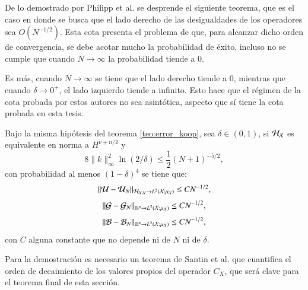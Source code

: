 De lo demostrado por Philipp et al. se desprende el siguiente teorema, que es el caso en donde se busca que el lado derecho de las desigualdades de los operadores sea $O(N^{-1/2})$. Esta cota presenta el problema de que, para alcanzar dicho orden de convergencia, se debe acotar mucho la probabilidad de éxito, incluso no se cumple que cuando $N \to \infty$ la probabilidad tiende a $0$. 

Es más, cuando $N \to \infty$ se tiene que el lado derecho tiende a $0$, mientras que cuando $\delta \to 0^+$, el lado izquierdo tiende a infinito. Esto hace que el régimen de la cota probada por estos autores no sea asintótica, aspecto que sí tiene la cota probada en esta tesis.

\begin{teo}
    Bajo la misma hipótesis del teorema \ref{teo:error_koop}, sea $\delta \in (0, 1)$, si $\mathcal{H}_{\mathcal{X}}$ es equivalente en norma a $H^{\nu + n/2}$ y
    \[
    8\|k\|^2_\infty \ln(2/\delta) \leq \frac{1}{2} (N+1)^{-5/2},
    \]
    con probabilidad al menos $(1 - \delta)^4$ se tiene que:
    \begin{equation*}
        \| \mathcal{U} - \mathcal{U}_N \|_{\mathcal{H}_{\mathcal{X}, N} \to L^2(\mathcal{X}; \mu_{\mathcal{X}})} \leq C N^{-1/2},
    \end{equation*}
    \begin{equation*}
    \| \mathcal{G} - \mathcal{G}_N \|_{\mathbb{R}^p \to L^2(\mathcal{X}; \mu_{\mathcal{X}})} \leq C N^{-1/2},
    \end{equation*}
    \begin{equation*}
    \| \mathcal{B} - \mathcal{B}_N \|_{\mathbb{R}^n \to L^2(\mathcal{X}; \mu_{\mathcal{X}})} \leq C N^{-1/2},
    \end{equation*}
    con $C$ alguna constante que no depende ni de $N$ ni de $\delta$.
    \label{teo:error_koop_sqrt_N_hip}
\end{teo}

Para la demostración es necesario un teorema de Santin et al. que cuantifica el orden de decaimiento de los valores propios del operador $C_X$, que será clave para el teorema final de esta sección.

